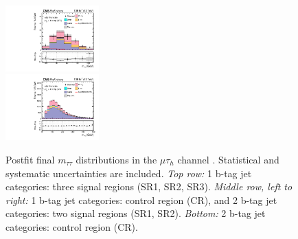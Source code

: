 \begin{figure}[ht]
\begin{center}
        \includegraphics[width=0.32\textwidth]{figures/ch-13-results/mt_all_6_post_prelim-yes.pdf}\\
        \includegraphics[width=0.32\textwidth]{figures/ch-13-results/mt_all_7_post_prelim-yes.pdf}
    \end{center}
    \caption[Postfit final $m_{\tau\tau}$ distributions in the $\mu\tau_{h}$ channel.]{Postfit final $m_{\tau\tau}$ distributions in the $\mu\tau_{h}$ channel \cite{CMS-AN-20-213}. Statistical and systematic uncertainties are included. \textit{Top row:} 1 b-tag jet categories: three signal regions (SR1, SR2, SR3). \textit{Middle row, left to right:} 1 b-tag jet categories: control region (CR), and 2 b-tag jet categories: two signal regions (SR1, SR2). \textit{Bottom:} 2 b-tag jet categories: control region (CR).}
    \label{fig:results_mtt_postfit_mtall}
\end{figure}


